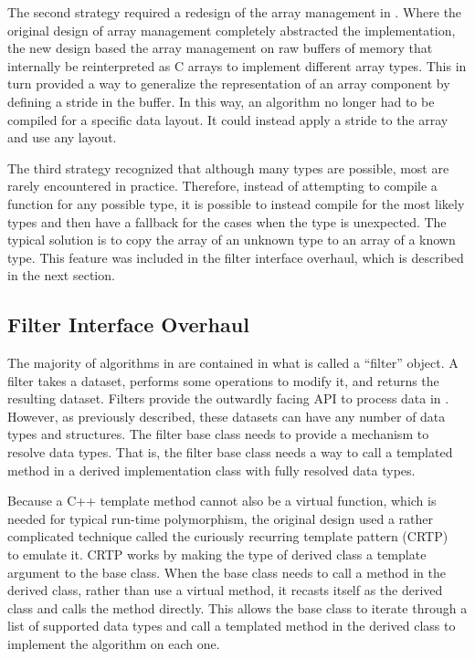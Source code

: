 The second strategy required a redesign of the array management in \vtkm.
Where the original design of array management completely abstracted the implementation, the new design based the array management on raw buffers of memory that internally be reinterpreted as C arrays to implement different array types.
This in turn provided a way to generalize the representation of an array component by defining a stride in the buffer.
In this way, an algorithm no longer had to be compiled for a specific data layout.
It could instead apply a stride to the array and use any layout.

The third strategy recognized that although many types are possible, most are rarely encountered in practice.
Therefore, instead of attempting to compile a function for any possible type, it is possible to instead compile for the most likely types and then have a fallback for the cases when the type is unexpected.
The typical solution is to copy the array of an unknown type to an array of a known type.
This feature was included in the filter interface overhaul, which is described in the next section.

\subsection{Filter Interface Overhaul}
\label{sec:filter-overhaul}


The majority of algorithms in \vtkm are contained in what is called a ``filter'' object.
A filter takes a dataset, performs some operations to modify it, and returns the resulting dataset.
Filters provide the outwardly facing API to process data in \vtkm.
However, as previously described, these datasets can have any number of data types and structures.
The \vtkm filter base class needs to provide a mechanism to resolve data types.
That is, the filter base class needs a way to call a templated method in a derived implementation class with fully resolved data types.

Because a C++ template method cannot also be a virtual function, which is needed for typical run-time polymorphism, the original design used a rather complicated technique called the curiously recurring template pattern (CRTP)~\citep{Coplien1995} to emulate it.
CRTP works by making the type of derived class a template argument to the base class.
When the base class needs to call a method in the derived class, rather than use a virtual method, it recasts itself as the derived class and calls the method directly.
This allows the base class to iterate through a list of supported data types and call a templated method in the derived class to implement the algorithm on each one.

